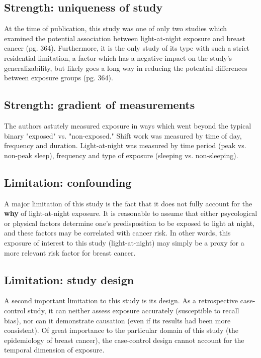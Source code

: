 \documentclass{article}
\begin{document}
\begin{multicols}{2}
\subsection*{Strength: uniqueness of study}
At the time of publication, this study was one of only two studies which examined the potential association between light-at-night exposure and breast cancer (pg. 364).  Furthermore, it is the only study of its type with such a strict residential limitation, a factor which has a negative impact on the study's generalizability, but likely goes a long way in reducing the potential differences between exposure groups (pg. 364).

\subsection*{Strength: gradient of measurements}
The authors astutely measured exposure in ways which went beyond the typical binary "exposed" vs. "non-exposed."  Shift work was measured by time of day, frequency and duration.  Light-at-night was measured by time period (peak vs. non-peak sleep), frequency and type of exposure (sleeping vs. non-sleeping).

\subsection*{Limitation: confounding}
A major limitation of this study is the fact that it does not fully account for the \textbf{why} of light-at-night exposure.  It is reasonable to assume that either psycological or physical factors determine one's predisposition to be exposed to light at night, and these factors may be correlated with cancer risk.  In other words, this exposure of interest to this study (light-at-night) may simply be a proxy for a more relevant risk factor for breast cancer.

\subsection*{Limitation: study design}
A second important limitation to this study is its design.  As a retrospective case-control study, it can neither assess exposure accurately (susceptible to recall bias), nor can it demonstrate causation (even if its results had been more consistent).  Of great importance to the particular domain of this study (the epidemiology of breast cancer), the case-control design cannot account for the temporal dimension of exposure.


\end{multicols}
\end{document}

